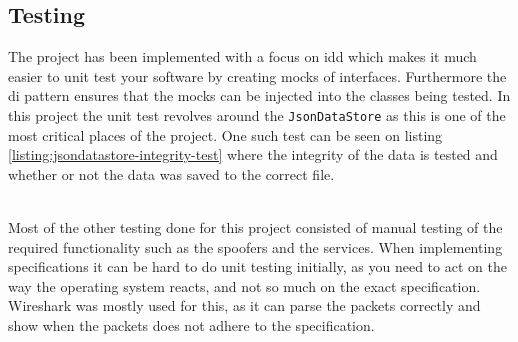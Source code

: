 \documentclass{article}
\begin{document}
\subsection{Testing}
The project has been implemented with a focus on \gls{idd} which makes it much easier to unit test your software by creating mocks of interfaces. Furthermore the \gls{di} pattern ensures that the mocks can be injected into the classes being tested. In this project the unit test revolves around the \texttt{JsonDataStore} as this is one of the most critical places of the project. One such test can be seen on listing \ref{listing:jsondatastore-integrity-test} where the integrity of the data is tested and whether or not the data was saved to the correct file.
\\\\

Most of the other testing done for this project consisted of manual testing of the required functionality such as the spoofers and the services. When implementing specifications it can be hard to do unit testing initially, as you need to act on the way the operating system reacts, and not so much on the exact specification. Wireshark\cite{url:implementation:wireshark} was mostly used for this, as it can parse the packets correctly and show when the packets does not adhere to the specification.
\end{document}
